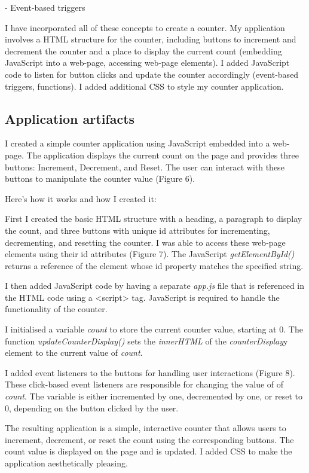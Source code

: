 \documentclass[a4paper, 11pt]{report}
\begin{document}
- Event-based triggers

I have incorporated all of these concepts to create a counter. My application involves a HTML structure for the counter, including buttons to increment and decrement the counter and a place to display the current count (embedding JavaScript into a web-page, accessing web-page elements). I added JavaScript code to listen for button clicks and update the counter accordingly (event-based triggers, functions). I added additional CSS to style my counter application.

\subsection{Application artifacts}

I created a simple counter application using JavaScript embedded into a web-page. The application displays the current count on the page and provides three buttons: Increment, Decrement, and Reset. The user can interact with these buttons to manipulate the counter value (Figure 6).

Here's how it works and how I created it:

First I created the basic HTML structure with a heading, a paragraph to display the count, and three buttons with unique id attributes for incrementing, decrementing, and resetting the counter. I was able to access these web-page elements using their id attributes (Figure 7). The JavaScript \emph{getElementById()} returns a reference of the element whose id property matches the specified string. 

I then added JavaScript code by having a separate \emph{app.js} file that is referenced in the HTML code using a <script> tag. JavaScript is required to handle the functionality of the counter.

I initialised a variable \emph{count} to store the current counter value, starting at 0. The function \emph{updateCounterDisplay()} sets the \emph{innerHTML} of the \emph{counterDisplay}y element to the current value of \emph{count}.

I added event listeners to the buttons for handling user interactions (Figure 8). These click-based event listeners are responsible for changing the value of of \emph{count}. The variable is either incremented by one, decremented by one, or reset to 0, depending on the button clicked by the user.

The resulting application is a simple, interactive counter that allows users to increment, decrement, or reset the count using the corresponding buttons. The count value is displayed on the page and is updated. I added CSS to make the application aesthetically pleasing.
\end{document}

